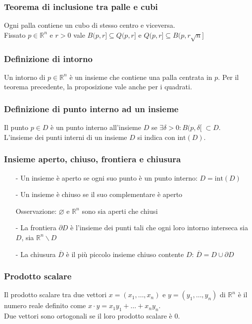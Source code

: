\documentclass[a4paper]{article}
\newcommand\intr{\text{int}}  %
\newcommand\Rn{\mathbb{R}^n}  %
\begin{document}
\subsubsection*{Teorema di inclusione tra palle e cubi}
Ogni palla contiene un cubo di stesso centro e viceversa. \\
Fissato \(p \in \Rn\) e \(r > 0\) vale \(B(p,r] \subseteq Q(p,r]\) e \(Q(p,r] \subseteq B(p,r\sqrt{n}]\)

\subsubsection*{Definizione di intorno}
Un intorno di \(p \in \Rn\) è un insieme che contiene una palla centrata in \(p\). Per il teorema precedente, la proposizione vale
anche per i quadrati.

\subsubsection*{Definizione di punto interno ad un insieme}
Il punto \(p \in D\) è un punto interno all'insieme \(D\) se \(\exists \delta > 0 : B(p,\delta[ \; \subset D\). \\
L'insieme dei punti interni di un insieme \(D\) si indica con \(\intr(D)\).

\subsubsection*{Insieme aperto, chiuso, frontiera e chiusura}
\begin{itemize}[topsep=3pt, itemsep=0pt]
	\item[-] Un insieme è aperto se ogni suo punto è un punto interno: \(D = \intr(D)\)
	\item[-] Un insieme è chiuso se il suo complementare è aperto
	\item[] Osservazione: \(\varnothing\) e \(\Rn\) sono sia aperti che chiusi
	\item[-] La frontiera \(\partial D\) è l'insieme dei punti tali che ogni loro intorno interseca sia \(D\), sia \(\Rn \backslash D\)
	\item[-] La chiusura \(\overline{D}\) è il più piccolo insieme chiuso contente \(D\): \(\overline{D} = D \cup \partial D\)
\end{itemize}

\subsubsection*{Prodotto scalare}
Il prodotto scalare tra due vettori \(x = \left( x_1, \dots, x_n \right)\) e \(y = \left( y_1, \dots, y_n \right)\) di \(\Rn\)
è il numero reale definito come \(x \cdot y = x_1 y_1 + \dots + x_n y_n\). \\
Due vettori sono ortogonali se il loro prodotto scalare è 0.
\end{document}
